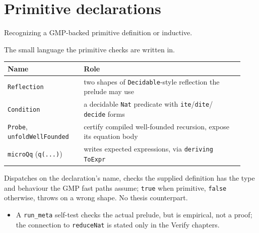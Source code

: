 \section{Primitive declarations}

Recognizing a GMP-backed primitive definition or inductive.

\begin{definition}
\label{family:kernel-primitive-dsl}
\leanok
{}
 The small language the primitive checks are written in.
\par\smallskip\noindent
\begin{tabular}{p{0.30\linewidth}p{0.63\linewidth}}
\toprule
Name & Role \\
\midrule
\texttt{Reflection} & two shapes of \texttt{Decidable}-style reflection the prelude may use \\
\texttt{Condition} & a decidable \texttt{Nat} predicate with \texttt{ite}/\texttt{dite}/
\texttt{decide} forms \\
\texttt{Probe}, \texttt{unfoldWellFounded} & certify compiled well-founded recursion, expose its
equation body \\
\texttt{microQq} (\texttt{q(...)}) & writes expected expressions, via \texttt{deriving ToExpr} \\
\bottomrule
\end{tabular}\par\smallskip
\end{definition}

\begin{definition}
\label{def:kernel-primitive-checkdef}
\leanok
{}
 Dispatches on the declaration's name, checks the supplied definition has the type
and behaviour the GMP fast paths assume; \texttt{true} when primitive, \texttt{false} otherwise,
throws on a wrong shape. No thesis counterpart.
\begin{itemize}
\item {} A \texttt{run\_meta} self-test checks the actual prelude, but is empirical,
not a proof; the connection to \texttt{reduceNat} is stated only in the Verify chapters.
\end{itemize}
\end{definition}

